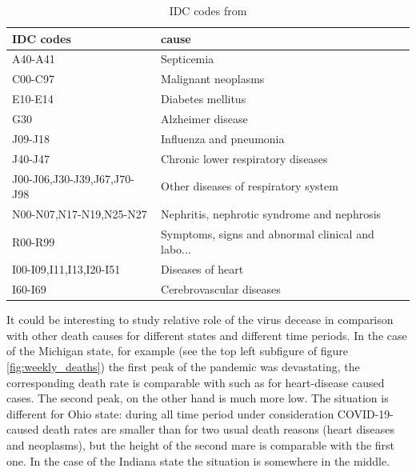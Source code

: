 \documentclass[conference]{IEEEtran}
\begin{document}
\begin{table}
  \centering
  \begin{tabular}{ll}
\toprule
IDC codes&                                              cause \\
\midrule
A40-A41                     &                                        Septicemia  \\
C00-C97                     &                               Malignant neoplasms  \\
E10-E14                     &                                 Diabetes mellitus  \\
G30                         &                                 Alzheimer disease  \\
J09-J18                     &                           Influenza and pneumonia  \\
J40-J47                     &                Chronic lower respiratory diseases  \\
J00-J06,J30-J39,J67,J70-J98 &              Other diseases of respiratory system  \\
N00-N07,N17-N19,N25-N27     &       Nephritis, nephrotic syndrome and nephrosis  \\
R00-R99                     &  Symptoms, signs and abnormal clinical and labo... \\
I00-I09,I11,I13,I20-I51     &                                 Diseases of heart  \\
I60-I69                     &                          Cerebrovascular diseases  \\
\bottomrule
\end{tabular}
\caption{IDC codes from \cite{cdc_international_nodate}}
\label{tab:IDC_codes}
\end{table}


It could be interesting to study relative role of the virus decease in comparison with other death causes for different states and different time periods. In the case of the Michigan state, for example (see the top left subfigure of figure \ref{fig:weekly_deaths}) the first peak of the pandemic was devastating, the corresponding death rate is comparable  with such as for heart-disease caused cases. The second peak, on the other hand is much more low. The situation is different for Ohio state: during all time period under consideration COVID-19-caused death rates are smaller than for two usual death reasons (heart diseases and neoplasms), but the height of the second mare is comparable with the first one. In the case of the Indiana state the situation is somewhere in the middle.
\end{document}
